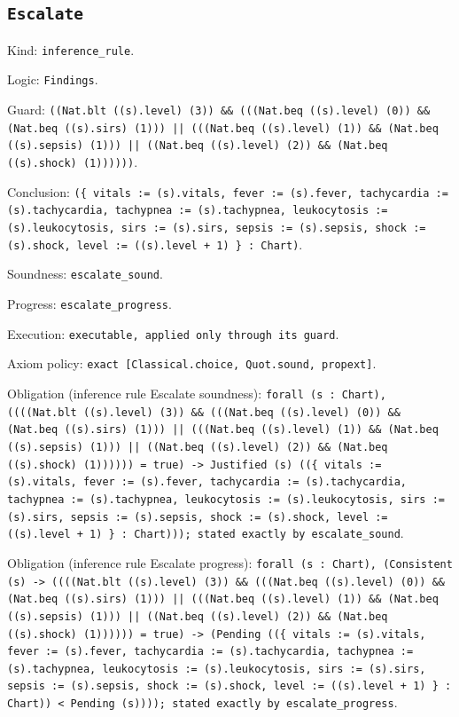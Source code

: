 \documentclass[11pt]{article}
\begin{document}
\subsection*{\texttt{Escalate}}
\noindent Kind: \texttt{inference_rule}.\par
\noindent Logic: \texttt{Findings}.\par
\noindent Guard: \texttt{((Nat.blt ((s).level) (3)) \&\& (((Nat.beq ((s).level) (0)) \&\& (Nat.beq ((s).sirs) (1))) || (((Nat.beq ((s).level) (1)) \&\& (Nat.beq ((s).sepsis) (1))) || ((Nat.beq ((s).level) (2)) \&\& (Nat.beq ((s).shock) (1))))))}.\par
\noindent Conclusion: \texttt{(\{ vitals := (s).vitals, fever := (s).fever, tachycardia := (s).tachycardia, tachypnea := (s).tachypnea, leukocytosis := (s).leukocytosis, sirs := (s).sirs, sepsis := (s).sepsis, shock := (s).shock, level := ((s).level + 1) \} : Chart)}.\par
\noindent Soundness: \texttt{escalate\_sound}.\par
\noindent Progress: \texttt{escalate\_progress}.\par
\noindent Execution: \texttt{executable, applied only through its guard}.\par
\noindent Axiom policy: \texttt{exact [Classical.choice, Quot.sound, propext]}.\par
\noindent Obligation (inference rule Escalate soundness): \texttt{forall (s : Chart), ((((Nat.blt ((s).level) (3)) \&\& (((Nat.beq ((s).level) (0)) \&\& (Nat.beq ((s).sirs) (1))) || (((Nat.beq ((s).level) (1)) \&\& (Nat.beq ((s).sepsis) (1))) || ((Nat.beq ((s).level) (2)) \&\& (Nat.beq ((s).shock) (1)))))) = true) -> Justified (s) ((\{ vitals := (s).vitals, fever := (s).fever, tachycardia := (s).tachycardia, tachypnea := (s).tachypnea, leukocytosis := (s).leukocytosis, sirs := (s).sirs, sepsis := (s).sepsis, shock := (s).shock, level := ((s).level + 1) \} : Chart))); stated exactly by escalate\_sound}.\par
\noindent Obligation (inference rule Escalate progress): \texttt{forall (s : Chart), (Consistent (s) -> ((((Nat.blt ((s).level) (3)) \&\& (((Nat.beq ((s).level) (0)) \&\& (Nat.beq ((s).sirs) (1))) || (((Nat.beq ((s).level) (1)) \&\& (Nat.beq ((s).sepsis) (1))) || ((Nat.beq ((s).level) (2)) \&\& (Nat.beq ((s).shock) (1)))))) = true) -> (Pending ((\{ vitals := (s).vitals, fever := (s).fever, tachycardia := (s).tachycardia, tachypnea := (s).tachypnea, leukocytosis := (s).leukocytosis, sirs := (s).sirs, sepsis := (s).sepsis, shock := (s).shock, level := ((s).level + 1) \} : Chart)) < Pending (s)))); stated exactly by escalate\_progress}.\par
\end{document}
